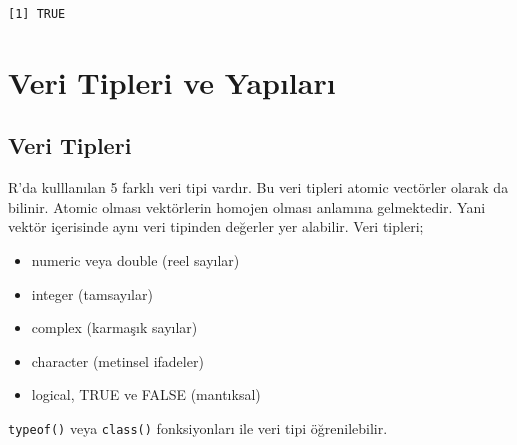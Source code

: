 \documentclass[
  letterpaper,
  DIV=11,
  numbers=noendperiod]{scrreprt}
\begin{document}
\begin{verbatim}
[1] TRUE
\end{verbatim}

\chapter{Veri Tipleri ve
Yapıları}\label{veri-tipleri-ve-yapux131larux131}

\section{Veri Tipleri}\label{veri-tipleri}

R'da kulllanılan 5 farklı veri tipi vardır. Bu veri tipleri atomic
vectörler olarak da bilinir. Atomic olması vektörlerin homojen olması
anlamına gelmektedir. Yani vektör içerisinde aynı veri tipinden değerler
yer alabilir. Veri tipleri;

\begin{itemize}
\item
  numeric veya double (reel sayılar)
\item
  integer (tamsayılar)
\item
  complex (karmaşık sayılar)
\item
  character (metinsel ifadeler)
\item
  logical, TRUE ve FALSE (mantıksal)
\end{itemize}

\texttt{typeof()} veya \texttt{class()} fonksiyonları ile veri tipi
öğrenilebilir.
\end{document}
